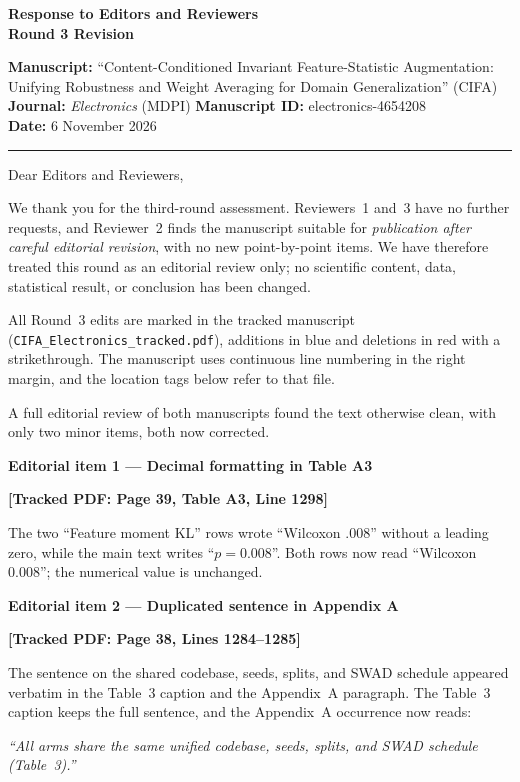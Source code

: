 \documentclass[11pt]{article}
\newcommand{\loc}[1]{\textbf{[\textcolor{revblue}{Tracked PDF: #1}]}}
\renewcommand{\subsection}[1]{\vspace{0.35em}\noindent\textbf{#1}\par\nobreak\vspace{0.1em}}
\renewenvironment{quote}{\list{}{\topsep=0.15em\partopsep=0pt\itemindent=0pt\leftmargin=1.6em\rightmargin=0pt}\item\relax}{\endlist}
\begin{document}
\begin{center}
{\Large\textbf{Response to Editors and Reviewers}}\\[0.4em]
\textbf{Round 3 Revision}
\end{center}

\textbf{Manuscript:} ``Content-Conditioned Invariant Feature-Statistic
Augmentation: Unifying Robustness and Weight Averaging for Domain
Generalization'' (CIFA)\\
\textbf{Journal:} \textit{Electronics} (MDPI)\qquad
\textbf{Manuscript ID:} electronics-4654208\\
\textbf{Date:} 6 November 2026

\hrule
\vspace{0.25em}

Dear Editors and Reviewers,

We thank you for the third-round assessment. Reviewers~1 and~3 have no further
requests, and Reviewer~2 finds the manuscript suitable for \emph{publication
after careful editorial revision}, with no new point-by-point items. We have
therefore treated this round as an editorial review only; no scientific
content, data, statistical result, or conclusion has been changed.

All Round~3 edits are marked in the tracked manuscript
(\texttt{CIFA\_Electronics\_tracked.pdf}), additions in blue and deletions in
red with a strikethrough. The manuscript uses continuous line numbering in the
right margin, and the location tags below refer to that file.

A full editorial review of both manuscripts found the text otherwise clean,
with only two minor items, both now corrected.

\subsection{Editorial item 1 --- Decimal formatting in Table A3}
\loc{Page 39, Table A3, Line 1298}

The two ``Feature moment KL'' rows wrote ``Wilcoxon .008'' without a leading
zero, while the main text writes ``$p=0.008$''. Both rows now read ``Wilcoxon
0.008''; the numerical value is unchanged.

\subsection{Editorial item 2 --- Duplicated sentence in Appendix A}
\loc{Page 38, Lines 1284--1285}

The sentence on the shared codebase, seeds, splits, and SWAD schedule appeared
verbatim in the Table~3 caption and the Appendix~A paragraph. The Table~3
caption keeps the full sentence, and the Appendix~A occurrence now reads:
\begin{quote}
\emph{``All arms share the same unified codebase, seeds, splits, and SWAD
schedule (Table~3).''}
\end{quote}
\end{document}
